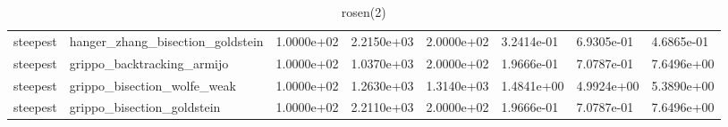 \documentclass[a4paper,11pt]{article}
\numberwithin{equation}{section} %
\begin{document}
\begin{table}[h!]
{\begin{tabular}{|l|l|l|l|l|l|l|l|}
        steepest & hanger\_zhang\_bisection\_goldstein & 1.0000e+02 & 2.2150e+03 & 2.0000e+02 & 3.2414e-01 & 6.9305e-01 & 4.6865e-01 \\
        steepest & grippo\_backtracking\_armijo & 1.0000e+02 & 1.0370e+03 & 2.0000e+02 & 1.9666e-01 & 7.0787e-01 & 7.6496e+00 \\
        steepest & grippo\_bisection\_wolfe\_weak & 1.0000e+02 & 1.2630e+03 & 1.3140e+03 & 1.4841e+00 & 4.9924e+00 & 5.3890e+00 \\
        steepest & grippo\_bisection\_goldstein & 1.0000e+02 & 2.2110e+03 & 2.0000e+02 & 1.9666e-01 & 7.0787e-01 & 7.6496e+00 \\

\end{tabular}}
\caption{rosen(2)}
\label{table:rosen(2)}
\end{table}
\end{document}
